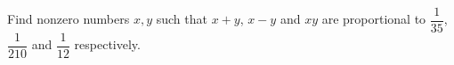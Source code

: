 Find nonzero numbers $x,y$ such that $x+y$, $x-y$ and $xy$ are proportional to $\dfrac1{35}$, $\dfrac1{210}$ and $\dfrac1{12}$ respectively.

